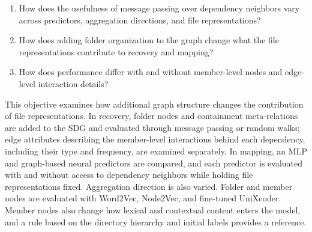 \begin{enumerate}[label=RQ3.\arabic*, leftmargin=3em, itemsep=-0.05pt]
    \item How does the usefulness of message passing over dependency neighbors vary across predictors, aggregation directions, and file representations?
    \item How does adding folder organization to the graph change what the file representations contribute to recovery and mapping?
    \item How does performance differ with and without member-level nodes and edge-level interaction details?
\end{enumerate}
This objective examines how additional graph structure changes the contribution of file representations. In recovery, folder nodes and containment meta-relations are added to the SDG and evaluated through message passing or random walks; edge attributes describing the member-level interactions behind each dependency, including their type and frequency, are examined separately. In mapping, an MLP and graph-based neural predictors are compared, and each predictor is evaluated with and without access to dependency neighbors while holding file representations fixed. Aggregation direction is also varied. Folder and member nodes are evaluated with Word2Vec, Node2Vec, and fine-tuned UniXcoder. Member nodes also change how lexical and contextual content enters the model, and a rule based on the directory hierarchy and initial labels provides a reference.
